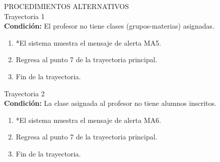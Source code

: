 \vspace*{1cm}
\Large{PROCEDIMIENTOS ALTERNATIVOS}\\
\large{Trayectoria 1}\\
\textbf{Condición:} El profesor no tiene clases (grupos-materias) asignadas.
\begin{enumerate}
    \item *El sistema muestra el mensaje de alerta MA5.
    \item Regresa al punto 7 de la trayectoria principal.
    \item Fin de la trayectoria.
\end{enumerate}
\large{Trayectoria 2}\\
\textbf{Condición:} La clase asignada al profesor no tiene alumnos inscritos.
\begin{enumerate}
    \item *El sistema muestra el mensaje de alerta MA6.
    \item Regresa al punto 7 de la trayectoria principal.
    \item Fin de la trayectoria. 
\end{enumerate}
